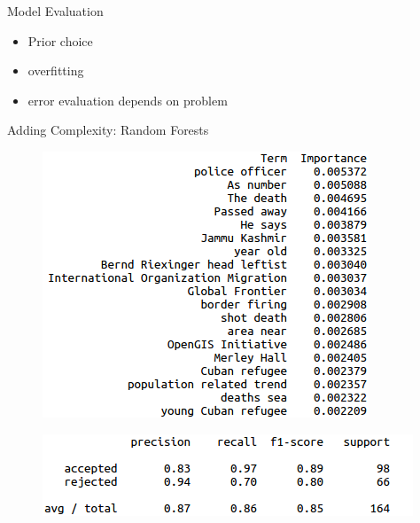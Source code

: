 \documentclass{beamer}
\begin{document}
\begin{frame}{Model Evaluation}

\begin{itemize}
	\item Prior choice  
	\item overfitting  
	\item error evaluation depends on problem 
\end{itemize}
\end{frame}

\begin{frame}{Adding Complexity: Random Forests}

\begin{figure}
\centering

\includegraphics[scale=0.5]{randomforestvis.png}
\label{randomforest}

\includegraphics[scale=0.5]{randomforest.png}

\end{figure}

\end{frame}

\end{document}
